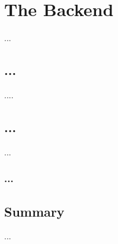 \chapter{The Backend}
\label{ch:lit_rev}

...
\section{...}
....


\section{...}
...


\subsection{...}


\section{Summary}
...


